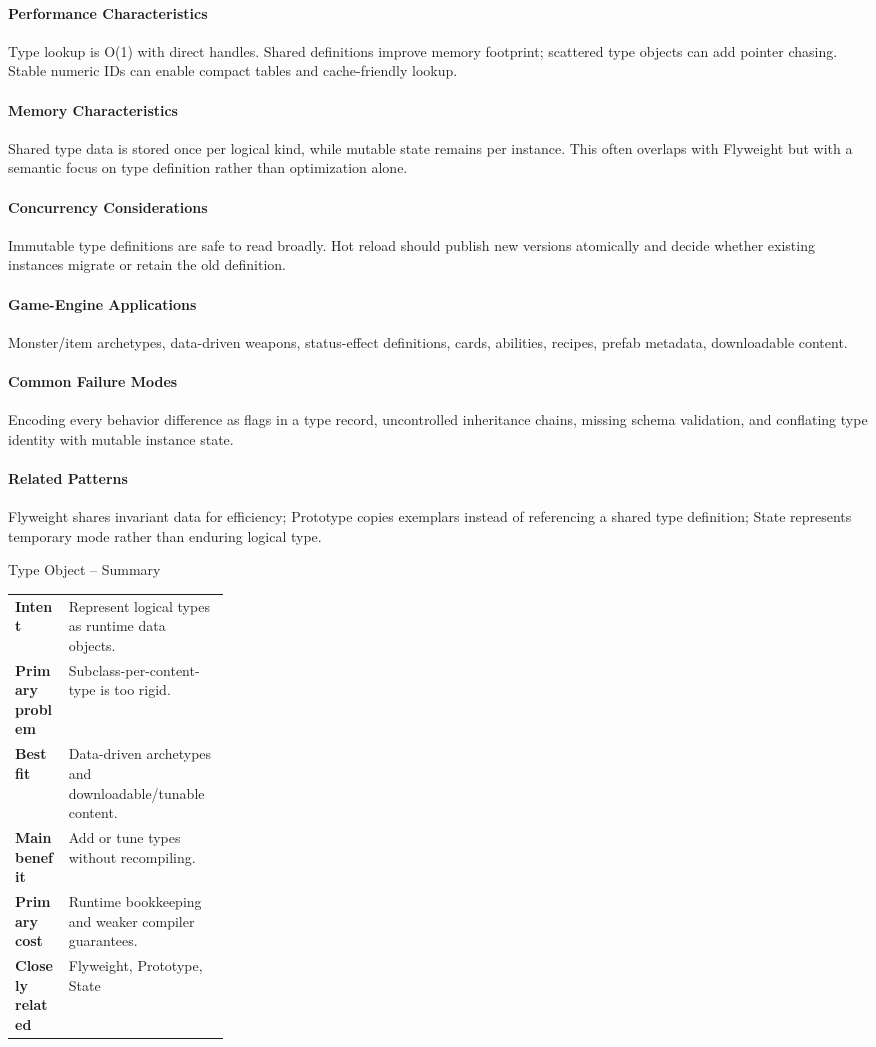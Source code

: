 \documentclass[11pt]{article}
\begin{document}
\paragraph{Performance Characteristics} Type lookup is O(1) with direct handles. Shared definitions improve memory footprint; scattered type objects can add pointer chasing. Stable numeric IDs can enable compact tables and cache-friendly lookup.
\paragraph{Memory Characteristics} Shared type data is stored once per logical kind, while mutable state remains per instance. This often overlaps with Flyweight but with a semantic focus on type definition rather than optimization alone.
\paragraph{Concurrency Considerations} Immutable type definitions are safe to read broadly. Hot reload should publish new versions atomically and decide whether existing instances migrate or retain the old definition.
\paragraph{Game-Engine Applications} Monster/item archetypes, data-driven weapons, status-effect definitions, cards, abilities, recipes, prefab metadata, downloadable content.
\paragraph{Common Failure Modes} Encoding every behavior difference as flags in a type record, uncontrolled inheritance chains, missing schema validation, and conflating type identity with mutable instance state.
\paragraph{Related Patterns} Flyweight shares invariant data for efficiency; Prototype copies exemplars instead of referencing a shared type definition; State represents temporary mode rather than enduring logical type.

\begin{patternsummary}{Type Object -- Summary}
\begin{tabularx}{\linewidth}{@{}>{\bfseries}p{0.25\linewidth}X@{}}
Intent & Represent logical types as runtime data objects. \\
Primary problem & Subclass-per-content-type is too rigid. \\
Best fit & Data-driven archetypes and downloadable/tunable content. \\
Main benefit & Add or tune types without recompiling. \\
Primary cost & Runtime bookkeeping and weaker compiler guarantees. \\
Closely related & Flyweight, Prototype, State \\
\end{tabularx}
\end{patternsummary}
\end{document}

